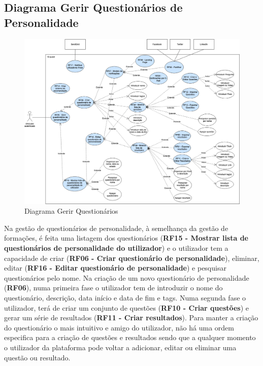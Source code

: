 \subsection{Diagrama Gerir Questionários de Personalidade}
\label{d:quests}
\begin{figure}[ht!]
	\begin{center}
		\includegraphics[width=1\textwidth]{img/rf/gerir-quest}
		\caption{Diagrama Gerir Questionários}
		\label{fig:rf-gerir-quest}
	\end{center}
\end{figure}

Na gestão de questionários de personalidade, à semelhança da gestão de formações, é feita uma listagem dos questionários (\textbf{RF15 - Mostrar lista de questionários de personalidade do utilizador}) e o utilizador tem a capacidade de criar (\textbf{RF06 - Criar questionário de personalidade}), eliminar, editar (\textbf{RF16 - Editar questionário de personalidade}) e pesquisar questionários pelo nome.
Na criação de um novo questionário de personalidade (\textbf{RF06}), numa primeira fase o utilizador tem de introduzir o nome do questionário, descrição, data início e data de fim e tags. Numa segunda fase o utilizador, terá de criar um conjunto de questões (\textbf{RF10 - Criar questões}) e gerar um série de resultados (\textbf{RF11 - Criar resultados}). Para manter a criação do questionário o mais intuitivo e amigo do utilizador, não há uma ordem especifica para a criação de questões e resultados sendo que a qualquer momento o utilizador da plataforma pode voltar a adicionar, editar ou eliminar uma questão ou resultado. 

